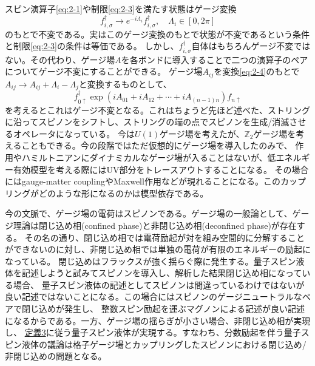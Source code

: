 \documentclass[11pt, aps, longbibliography]{article}
\begin{document}
        スピン演算子\eqref{eq:2-1}や制限\eqref{eq:2-3}を満たす状態はゲージ変換
        \begin{equation}\label{eq:2-4}
            f_{i,\sigma}^\dagger \rightarrow e^{-i\Lambda_i}f_{i,\sigma}^\dagger, \quad \Lambda_i \in [0,2\pi]
        \end{equation}
        のもとで不変である。実はこのゲージ変換のもとで状態が不変であるという条件と制限\eqref{eq:2-3}の条件は等価である。
        しかし、$ f_{i,\sigma}^\dagger$自体はもちろんゲージ不変ではない。その代わり、ゲージ場$A$を各ボンドに導入することで二つの演算子のペアについてゲージ不変にすることができる。
        ゲージ場$A_{ij}$を変換\eqref{eq:2-4}のもとで$A_{ij}\rightarrow A_{ij}+\Lambda_i-\Lambda_j$と変換するものとして、
        \begin{equation}\label{eq:2-5}
            f_{0\uparrow}^\dagger \exp(iA_{01} + iA_{12} + \cdots + iA_{(n-1)n})f_{n\uparrow}
        \end{equation}
        を考えるとこれはゲージ不変となる。これはちょうど先ほど述べた、ストリングに沿ってスピノンをシフトし、ストリングの端の点でスピノンを生成/消滅させるオペレータになっている。
        今は$U(1)$ゲージ場を考えたが、$\mathbb{Z}_2$ゲージ場を考えることもできる。今の段階ではただ仮想的にゲージ場を導入したのみで、
        作用やハミルトニアンにダイナミカルなゲージ場が入ることはないが、低エネルギー有効模型を考える際にはUV部分をトレースアウトすることになる。
        その場合にはgauge-matter couplingやMaxwell作用などが現れることになる。このカップリングがどのような形になるのかは模型依存である。
        
        今の文脈で、ゲージ場の電荷はスピノンである。ゲージ場の一般論として、ゲージ理論は閉じ込め相(confined phase)と非閉じ込め相(deconfined phase)が存在する。
        その名の通り、閉じ込め相では電荷励起が対を組み空間的に分解することができないのに対し、非閉じ込め相では単独の電荷が有限のエネルギーの励起になっている。
        閉じ込めはフラックスが強く揺らぐ際に発生する。量子スピン液体を記述しようと試みてスピノンを導入し、解析した結果閉じ込め相になっている場合、
        量子スピン液体の記述としてスピノンは間違っているわけではないが良い記述ではないことになる。この場合にはスピノンのゲージニュートラルなペアで閉じ込めが発生し、
        整数スピン励起を運ぶマグノンによる記述が良い記述になるからである。一方、ゲージ場の揺らぎが小さい場合、非閉じ込め相が実現し、
        \hyperlink{def3}{定義3}に従う量子スピン液体が実現する。すなわち、分数励起を伴う量子スピン液体の議論は格子ゲージ場とカップリングしたスピノンにおける閉じ込め/非閉じ込めの問題となる。
\newpage
\end{document}
